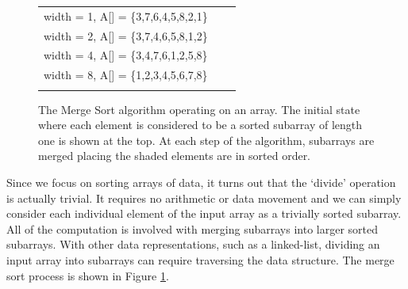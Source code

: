 \begin{figure}
\centering
\setlength{\fboxsep}{1pt}
\begin{tabular} {l l l } 
width = 1, A[] = \{\colorbox{black!10}{3},\colorbox{black!10}{7},\colorbox{black!10}{6},\colorbox{black!10}{4},\colorbox{black!10}{5},\colorbox{black!10}{8},\colorbox{black!10}{2},\colorbox{black!10}{1}\} \\
width = 2, A[] = \{\colorbox{black!10}{3,\hspace*{2\fboxsep}7},\colorbox{black!10}{4,\hspace*{2\fboxsep}6},\colorbox{black!10}{5,\hspace*{2\fboxsep}8},\colorbox{black!10}{1,\hspace*{2\fboxsep}2}\} \\
width = 4, A[] = \{\colorbox{black!10}{3,\hspace*{2\fboxsep}4,\hspace*{2\fboxsep}7,\hspace*{2\fboxsep}6},\colorbox{black!10}{1,\hspace*{2\fboxsep}2,\hspace*{2\fboxsep}5,\hspace*{2\fboxsep}8}\} \\
width = 8, A[] = \{\colorbox{black!10}{1,\hspace*{2\fboxsep}2,\hspace*{2\fboxsep}3,\hspace*{2\fboxsep}4,\hspace*{2\fboxsep}5,\hspace*{2\fboxsep}6,\hspace*{2\fboxsep}7,\hspace*{2\fboxsep}8}\} \\
\\
\end{tabular}
\caption{The Merge Sort algorithm operating on an array.  The initial state where each element is considered to be a sorted subarray of length one is shown at the top.   At each step of the algorithm, subarrays are merged placing the shaded elements are in sorted order.}
\label{fig:merge_sort_behavior}
\end{figure}

Since we focus on sorting arrays of data, it turns out that the `divide' operation is actually trivial.  It requires no arithmetic or data movement and we can simply consider each individual element of the input array as a trivially sorted subarray.  All of the computation is involved with merging subarrays into larger sorted subarrays.  With other data representations, such as a linked-list, dividing an input array into subarrays can require traversing the data structure.   The merge sort process is shown in Figure \ref{fig:merge_sort_behavior}.  

